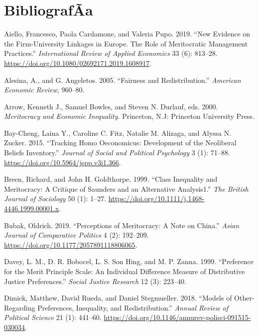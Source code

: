 \documentclass[
]{article}
\begin{document}
\hypertarget{bibliografaa}{%
\section*{BibliografÃ­a}\label{bibliografaa}}

\hypertarget{refs}{}
\leavevmode\hypertarget{ref-AielloNewevidencefirmuniversity2019}{}%
Aiello, Francesco, Paola Cardamone, and Valeria Pupo. 2019. ``New
Evidence on the Firm-University Linkages in Europe. The Role of
Meritocratic Management Practices.'' \emph{International Review of
Applied Economics} 33 (6): 813--28.
\url{https://doi.org/10.1080/02692171.2019.1608917}.

\leavevmode\hypertarget{ref-alesina_Fairness_2005}{}%
Alesina, A., and G. Angeletos. 2005. ``Fairness and Redistribution.''
\emph{American Economic Review}, 960--80.

\leavevmode\hypertarget{ref-arrow_meritocracy_2000}{}%
Arrow, Kenneth J., Samuel Bowles, and Steven N. Durlauf, eds. 2000.
\emph{Meritocracy and Economic Inequality}. Princeton, N.J: Princeton
University Press.

\leavevmode\hypertarget{ref-Bay-ChengTrackingHomoOeconomicus2015}{}%
Bay-Cheng, Laina Y., Caroline C. Fitz, Natalie M. Alizaga, and Alyssa N.
Zucker. 2015. ``Tracking Homo Oeconomicus: Development of the Neoliberal
Beliefs Inventory.'' \emph{Journal of Social and Political Psychology} 3
(1): 71--88. \url{https://doi.org/10.5964/jspp.v3i1.366}.

\leavevmode\hypertarget{ref-breenClassInequalityMeritocracy1999}{}%
Breen, Richard, and John H. Goldthorpe. 1999. ``Class Inequality and
Meritocracy: A Critique of Saunders and an Alternative Analysis1.''
\emph{The British Journal of Sociology} 50 (1): 1--27.
\url{https://doi.org/10.1111/j.1468-4446.1999.00001.x}.

\leavevmode\hypertarget{ref-BubakPerceptionsmeritocracynote2019}{}%
Bubak, Oldrich. 2019. ``Perceptions of Meritocracy: A Note on China.''
\emph{Asian Journal of Comparative Politics} 4 (2): 192--209.
\url{https://doi.org/10.1177/2057891118806065}.

\leavevmode\hypertarget{ref-davey_preference_1999}{}%
Davey, L. M., D. R. Bobocel, L. S. Son Hing, and M. P. Zanna. 1999.
``Preference for the Merit Principle Scale: An Individual Difference
Measure of Distributive Justice Preferences.'' \emph{Social Justice
Research} 12 (3): 223--40.

\leavevmode\hypertarget{ref-dimick_Models_2018}{}%
Dimick, Matthew, David Rueda, and Daniel Stegmueller. 2018. ``Models of
Other-Regarding Preferences, Inequality, and Redistribution.''
\emph{Annual Review of Political Science} 21 (1): 441--60.
\url{https://doi.org/10.1146/annurev-polisci-091515-030034}.
\end{document}
